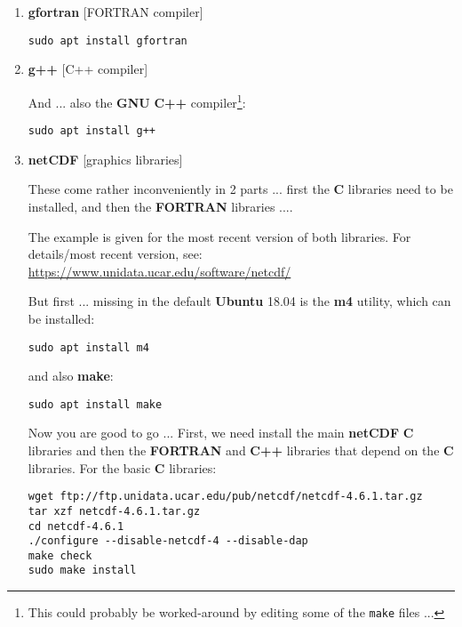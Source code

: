 \documentclass[11pt,fleqn]{book} %
\begin{document}
\begin{enumerate}[noitemsep]
\setlength{\itemindent}{-.4in}

\vspace{4pt}
\item \textbf{gfortran} [FORTRAN compiler]

\begin{verbatim}
sudo apt install gfortran
\end{verbatim}

\item \textbf{g++} [C++ compiler]

And ... also the \textbf{GNU} \textbf{C++} compiler\footnote{This could probably be worked-around by editing some of the \texttt{make} files ...}:

\begin{verbatim}
sudo apt install g++
\end{verbatim}

\item \textbf{netCDF} [graphics libraries]

\noindent These come rather inconveniently in 2 parts ... first the \textbf{C} libraries need to be installed, and then the \textbf{FORTRAN} libraries ....

The example is given for the most recent version of both libraries. For details/most recent version, see: \href{https://www.unidata.ucar.edu/software/netcdf/#}{https://www.unidata.ucar.edu/software/netcdf/}

But first ... missing in the default \textbf{Ubuntu} 18.04 is the \textbf{m4} utility, which can be installed:

\begin{verbatim}
sudo apt install m4
\end{verbatim}

and also \textbf{make}:

\begin{verbatim}
sudo apt install make
\end{verbatim}

Now you are good to go ...
First, we need install the main \textbf{netCDF} \textbf{C} libraries and then the \textbf{FORTRAN} and \textbf{C++} libraries that depend on the \textbf{C} libraries. For the basic \textbf{C} libraries:
\begin{verbatim}
wget ftp://ftp.unidata.ucar.edu/pub/netcdf/netcdf-4.6.1.tar.gz
tar xzf netcdf-4.6.1.tar.gz
cd netcdf-4.6.1
./configure --disable-netcdf-4 --disable-dap
make check
sudo make install
\end{verbatim}


\end{enumerate}
\end{document}
